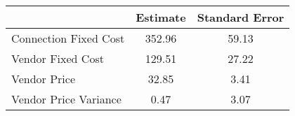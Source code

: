\begin{tabular}{lcc}
& Estimate & Standard Error \\
\hline
Connection Fixed Cost &352.96&59.13\\
Vendor Fixed Cost  &129.51&27.22\\
Vendor Price  &32.85&3.41\\
Vendor Price Variance  &0.47&3.07\\
\hline
\end{tabular}
